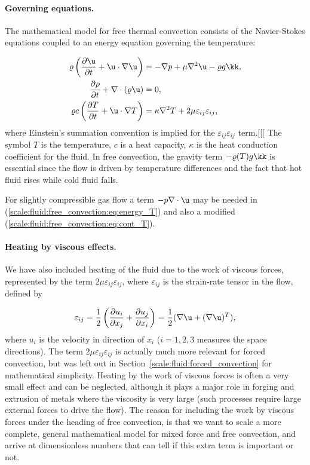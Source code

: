 \documentclass[graybox,envcountchap,sectrefs,final]{svmonodo}
\begin{document}

\paragraph{Governing equations.}
The mathematical model for free thermal convection
consists of the Navier-Stokes equations
coupled to an energy equation governing the temperature:

\begin{align}
\varrho\left(\frac{\partial \u}{\partial t} + \u\cdot\nabla\u\right)
&= -\nabla p + \mu\nabla^2\u - \varrho g\kk,
\label{scale:fluid:free_convection:eq:momentum_T}\\ 
\frac{\partial\rho}{\partial t} + \nabla\cdot(\varrho\u) & = 0,
\label{scale:fluid:free_convection:eq:cont_T}\\ 
\varrho c\left(\frac{\partial T}{\partial t} + \u\cdot\nabla T\right)
&= \kappa\nabla^2 T + 2\mu\varepsilon_{ij}\varepsilon_{ij},
\label{scale:fluid:free_convection:eq:energy_T}
\end{align}
where Einstein's summation convention is implied for the
$\varepsilon_{ij}\varepsilon_{ij}$ term.[[[
The symbol $T$ is the temperature, $c$ is a heat capacity, $\kappa$
is the heat conduction coefficient for the fluid. In free convection,
the gravity term $-\varrho(T) g\kk$ is essential since the flow is driven
by temperature differences and the fact that hot fluid rises while
cold fluid falls.

For slightly compressible gas flow a term $-p\nabla\cdot\u$ may be
needed in (\ref{scale:fluid:free_convection:eq:energy_T}) and also
a modified (\ref{scale:fluid:free_convection:eq:cont_T}).

\paragraph{Heating by viscous effects.}
We have also included heating of the fluid due to the work of viscous forces,
represented by the term $2\mu\varepsilon_{ij}\varepsilon_{ij}$, where
$\varepsilon_{ij}$ is the strain-rate tensor in the flow, defined by

\[ \varepsilon_{ij} = \frac{1}{2}\left(\frac{\partial u_i}{\partial x_j}
+ \frac{\partial u_j}{\partial x_i}\right) = \frac{1}{2}(\nabla\u + (\nabla\u)^T),\]
where $u_i$ is the velocity in direction of $x_i$ ($i=1,2,3$ measures
the space directions). The term $2\mu\varepsilon_{ij}\varepsilon_{ij}$
is actually much
more relevant for forced convection, but was left out in Section~\ref{scale:fluid:forced_convection} for mathematical simplicity.
Heating by the work of viscous forces is often a very small effect and
can be neglected, although it plays a major role in forging and
extrusion of metals where the viscosity is very large (such
processes require large external forces to drive the flow).  The reason
for including the work by viscous forces under the heading
of free convection, is that we want to scale a more complete,
general mathematical model for mixed force and free convection, and
arrive at dimensionless numbers that can tell if this extra term is
important or not.
\end{document}

